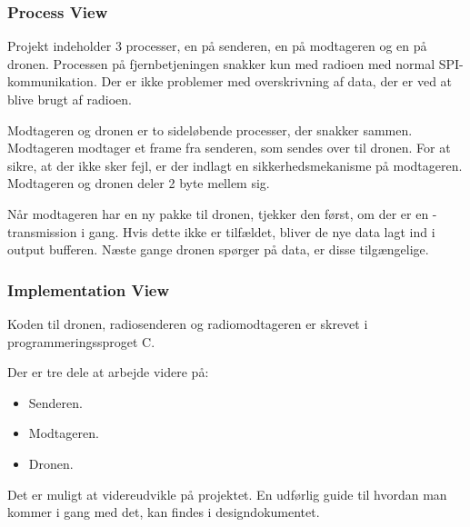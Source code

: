 \documentclass[Main]{subfiles}
\begin{document}
\subsubsection*{Process View}

Projekt indeholder 3 processer, en på senderen, en på modtageren og en på dronen.
Processen på fjernbetjeningen snakker kun med radioen med normal SPI-kommunikation. 
Der er ikke problemer med overskrivning af data, der er ved at blive brugt af radioen.

Modtageren og dronen er to sideløbende processer, der snakker sammen.
Modtageren modtager et frame fra senderen, som sendes over \itoc til dronen.
For at sikre, at der ikke sker fejl, er der indlagt en sikkerhedsmekanisme på modtageren. 
Modtageren og dronen deler 2 byte mellem sig.

Når modtageren har en ny pakke til dronen, tjekker den først, om der er en \itoc-transmission i gang. 
Hvis dette ikke er tilfældet, bliver de nye data lagt ind i output bufferen. 
Næste gange dronen spørger på data, er disse tilgængelige.

\subsubsection*{Implementation View}
Koden til dronen, radiosenderen og radiomodtageren er skrevet i programmeringssproget C.

Der er tre dele at arbejde videre på:
\vspace{-20pt}
\begin{itemize}
\item Senderen.
\item Modtageren.
\item Dronen.
\end{itemize}

Det er muligt at videreudvikle på projektet.
En udførlig guide til hvordan man kommer i gang med det, kan findes i  designdokumentet\cite[Afsnit 2.4]{Design}.
\end{document}
